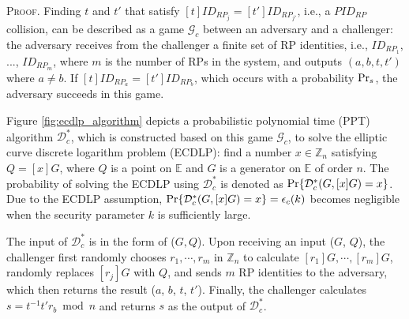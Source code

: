 \oldc
\vspace{0.75mm}
\noindent\textsc{Proof.}
Finding $t$ and $t'$ that satisfy $[t]ID_{RP_j} = [t']ID_{RP_{j'}}$, i.e., a $PID_{RP}$ collision, can be described as a game $\mathcal{G}_c$ between an adversary and a challenger: the adversary receives from the challenger a finite set of RP identities, i.e., $ID_{RP_1}$, ..., $ID_{RP_m}$, where $m$ is the number of RPs in the system, and outputs $(a, b, t, t')$ where $a \neq b$. If $[t]ID_{RP_a}=[t']ID_{RP_b}$, which occurs with a probability ${\rm Pr}_s$, the adversary succeeds in this game.

Figure \ref{fig:ecdlp_algorithm} depicts a probabilistic polynomial time (PPT) algorithm $\mathcal{D}^*_c$, which is constructed based on this game $\mathcal{G}_c$, to solve the elliptic curve discrete logarithm problem (ECDLP): find a number $x \in \mathbb{Z}_n$ satisfying $Q = [x]G$,
where $Q$ is a point on $\mathbb{E}$ and $G$ is a generator on $\mathbb{E}$ of order $n$.
The probability of solving the ECDLP using $\mathcal{D}^*_c$ is denoted as ${\rm Pr}\{\mathcal{D}^*_c(G, [x]G)=x\}$.
Due to the ECDLP assumption,
    ${\rm Pr}\{\mathcal{D}^*_c(G, [x]G)=x\} = \epsilon_{c}(k)$ becomes negligible when the security parameter $k$ is sufficiently large.



The input of $\mathcal{D}^*_c$ is in the form of ($G, Q$). Upon receiving an input ($G$, $Q$), the challenger first randomly chooses $r_1, \cdots, r_m$ in $\mathbb{Z}_n$ to calculate $[r_1]G, \cdots, [r_m]G$, randomly replaces $[r_j]G$ with $Q$, and sends $m$ RP identities to the adversary, which then returns the result ($a$, $b$, $t$, $t'$). Finally, the challenger calculates $s = t^{-1}t'r_b \bmod n$ and returns $s$ as the output of $\mathcal{D}^*_c$.


